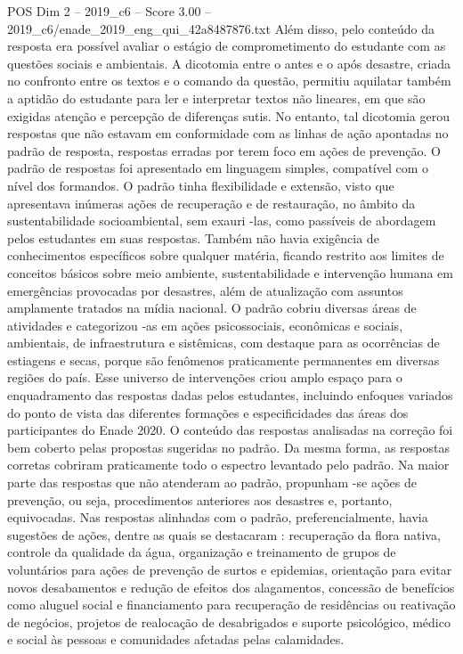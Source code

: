 \begin{textsample}{POS Dim 2 – 2019\_c6 – Score 3.00 – 2019\_c6/enade\_2019\_eng\_qui\_42a8487876.txt}
Além disso, pelo conteúdo da resposta era possível avaliar o estágio de comprometimento do estudante com as questões sociais e ambientais.
A dicotomia entre o antes e o após desastre, criada no confronto entre os textos e o comando da questão, permitiu aquilatar também a aptidão do estudante para ler e interpretar textos não lineares, em que são exigidas atenção e percepção de diferenças sutis.
No entanto, tal dicotomia gerou respostas que não estavam em conformidade com as linhas de ação apontadas no padrão de resposta, respostas erradas por terem foco em ações de prevenção.
O padrão de respostas foi apresentado em linguagem simples, compatível com o nível dos formandos.
O padrão tinha flexibilidade e extensão, visto que apresentava inúmeras ações de recuperação e de restauração, no âmbito da sustentabilidade socioambiental, sem exauri -las, como passíveis de abordagem pelos estudantes em suas respostas.
Também não havia exigência de conhecimentos específicos sobre qualquer matéria, ficando restrito aos limites de conceitos básicos sobre meio ambiente, sustentabilidade e intervenção humana em emergências provocadas por desastres, além de atualização com assuntos amplamente tratados na mídia nacional.
O padrão cobriu diversas áreas de atividades e categorizou -as em ações psicossociais, econômicas e sociais, ambientais, de infraestrutura e sistêmicas, com destaque para as ocorrências de estiagens e secas, porque são fenômenos praticamente permanentes em diversas regiões do país.
Esse universo de intervenções criou amplo espaço para o enquadramento das respostas dadas pelos estudantes, incluindo enfoques variados do ponto de vista das diferentes formações e especificidades das áreas dos participantes do Enade 2020.
O conteúdo das respostas analisadas na correção foi bem coberto pelas propostas sugeridas no padrão.
Da mesma forma, as respostas corretas cobriram praticamente todo o espectro levantado pelo padrão.
Na maior parte das respostas que não atenderam ao padrão, propunham -se ações de prevenção, ou seja, procedimentos anteriores aos desastres e, portanto, equivocadas.
Nas respostas alinhadas com o padrão, preferencialmente, havia sugestões de ações, dentre as quais se destacaram : recuperação da flora nativa, controle da qualidade da água, organização e treinamento de grupos de voluntários para ações de prevenção de surtos e epidemias, orientação para evitar novos desabamentos e redução de efeitos dos alagamentos, concessão de benefícios como aluguel social e financiamento para recuperação de residências ou reativação de negócios, projetos de realocação de desabrigados e suporte psicológico, médico e social às pessoas e comunidades afetadas pelas calamidades.

\end{textsample}
